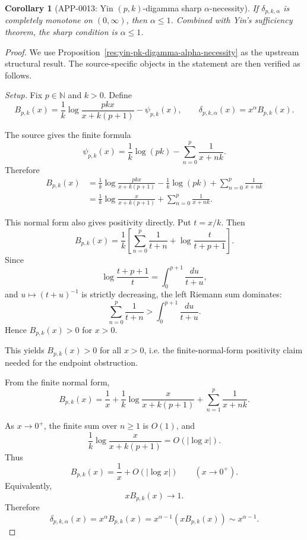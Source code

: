 \documentclass[11pt]{article}
\numberwithin{equation}{section}
\newtheorem{corollary}[theorem]{Corollary}
\theoremstyle{definition}
\theoremstyle{remark}
\newcommand{\1}{\mathbf 1}
\begin{document}
\begin{corollary}[APP-0013: Yin \((p,k)\)-digamma sharp \(\alpha\)-necessity]
\label{thm:yin-pk-alpha-necessity}
If \(\delta_{p,k,\alpha}\) is completely monotone on \((0,\infty)\), then \(\alpha\le1\).  Combined with Yin's sufficiency theorem, the sharp condition is \(\alpha\le1\).


\end{corollary}

\begin{proof}
We use Proposition~\ref{res:yin-pk-digamma-alpha-necessity} as the upstream structural result. The source-specific objects in the statement are then verified as follows.

\emph{Setup.}
Fix \(p\in\mathbb N\) and \(k>0\). Define
\[
B_{p,k}(x)=
\frac1k\log\frac{pkx}{x+k(p+1)}-\psi_{p,k}(x),
\qquad
\delta_{p,k,\alpha}(x)=x^\alpha B_{p,k}(x).
\]

The source gives the finite formula
\[
\psi_{p,k}(x)=\frac1k\log(pk)-\sum_{n=0}^p\frac1{x+nk}.
\]
Therefore
\[
\begin{aligned}
B_{p,k}(x)
&=
\frac1k\log\frac{pkx}{x+k(p+1)}
-\frac1k\log(pk)
+\sum_{n=0}^p\frac1{x+nk}  \\
&=
\frac1k\log\frac{x}{x+k(p+1)}
+\sum_{n=0}^p\frac1{x+nk}.
\end{aligned}
\]

This normal form also gives positivity directly. Put \(t=x/k\). Then
\[
B_{p,k}(x)
=\frac1k\left[
\sum_{n=0}^p\frac1{t+n}
+\log\frac{t}{t+p+1}
\right].
\]
Since
\[
\log\frac{t+p+1}{t}=\int_0^{p+1}\frac{du}{t+u},
\]
and \(u\mapsto(t+u)^{-1}\) is strictly decreasing, the left Riemann sum dominates:
\[
\sum_{n=0}^p\frac1{t+n}
>
\int_0^{p+1}\frac{du}{t+u}.
\]
Hence \(B_{p,k}(x)>0\) for \(x>0\).

This yields \(B_{p,k}(x)>0\) for all \(x>0\), i.e. the finite-normal-form positivity claim needed for the endpoint obstruction.

From the finite normal form,
\[
B_{p,k}(x)
=\frac1x
+\frac1k\log\frac{x}{x+k(p+1)}
+\sum_{n=1}^p\frac1{x+nk}.
\]

As \(x\to0^+\), the finite sum over \(n\ge1\) is \(O(1)\), and
\[
\frac1k\log\frac{x}{x+k(p+1)}=O(|\log x|).
\]
Thus
\[
B_{p,k}(x)=\frac1x+O(|\log x|)
\qquad (x\to0^+).
\]
Equivalently,
\[
xB_{p,k}(x)\to1.
\]
Therefore
\[
\delta_{p,k,\alpha}(x)
=x^\alpha B_{p,k}(x)
=x^{\alpha-1}(xB_{p,k}(x))
\sim x^{\alpha-1}.
\]


\end{proof}
\end{document}

